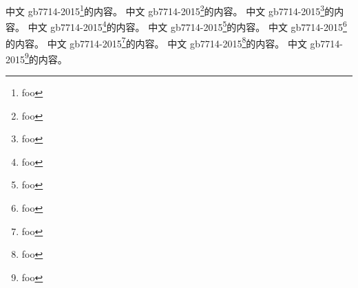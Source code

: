 \documentclass{qyd-note}
\begin{document}
中文 gb7714-2015\footnote{foo}的内容。
中文 gb7714-2015\footnote{foo}的内容。
中文 gb7714-2015\footnote{foo}的内容。
中文 gb7714-2015\footnote{foo}的内容。
中文 gb7714-2015\footnote{foo}的内容。
中文 gb7714-2015\footnote{foo}的内容。
中文 gb7714-2015\footnote{foo}的内容。
中文 gb7714-2015\footnote{foo}的内容。
中文 gb7714-2015\footnote{foo}的内容。
\end{document}
